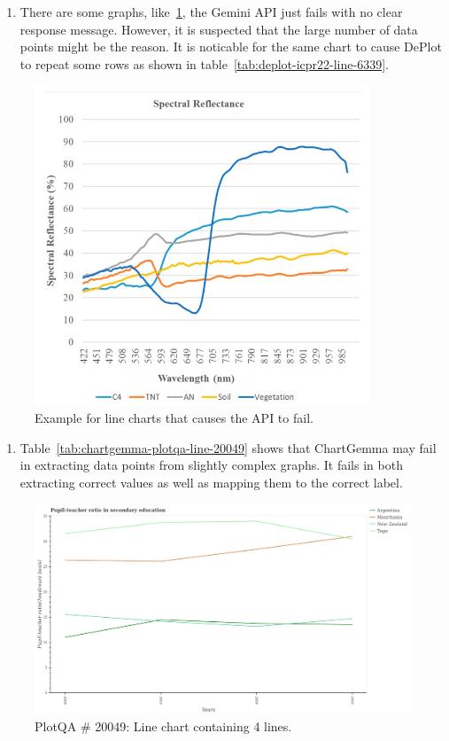 \documentclass[
	letterpaper, %
]{jdf}
\begin{document}
       \begin{enumerate}
     \item There are some graphs, like~\ref{fig:icpr22-line-6339}, the Gemini API just fails with no clear response message.
       However, it is suspected that the large number of data points might be the reason.
               It is noticable for the same chart to cause DePlot to repeat some rows as shown in table~\ref{tab:deplot-icpr22-line-6339}.
       \end{enumerate}
\begin{figure}
    \includegraphics[width=10cm]{test-sample/icpr22/images/line/PMC6339093___05.jpg}
   \caption{Example for line charts that causes the API to fail.}
   \label{fig:icpr22-line-6339}
   \end{figure}
   
       \begin{enumerate}
     \item Table~\ref{tab:chartgemma-plotqa-line-20049} shows that ChartGemma may fail in extracting data points from slightly complex graphs.
       It fails in both extracting correct values as well as mapping them to the correct label.
              \end{enumerate}
\begin{figure}
   \includegraphics{test-sample/plotqa/images/line/20049-4-lines.png}
   \caption{PlotQA \# 20049: Line chart containing 4 lines.}\label{fig:plotqa-line-20049}
   \end{figure}
\end{document}
